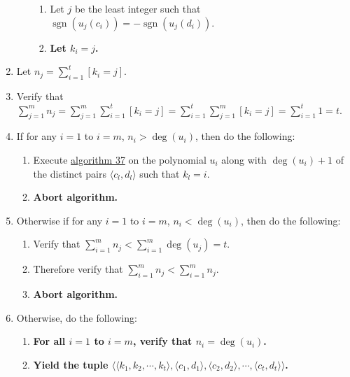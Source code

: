 \documentclass[twocolumn]{article}
\DeclareMathOperator{\sgn}{sgn}
\begin{document}
\begin{enumerate}
\begin{enumerate}
					\begin{enumerate}
						\item Let $j$ be the least integer such that $\sgn(u_j(c_i))=-\sgn(u_j(d_i))$.
						\item \textbf{Let $k_i=j$.}
					\end{enumerate}
				\end{enumerate}
				\item Let $n_j=\sum_{i=1}^t [k_i=j]$.
				\item Verify that $\sum_{j=1}^m n_j=\sum_{j=1}^m\sum_{i=1}^t [k_i=j]=\sum_{i=1}^t\sum_{j=1}^m [k_i=j]=\sum_{i=1}^t 1=t$.
				\item If for any $i=1$ to $i=m$, $n_i>\deg(u_i)$, then do the following:
				\begin{enumerate}
					\item Execute \hyperref[sec:algorithm 37]{algorithm 37} on the polynomial $u_i$ along with $\deg(u_i)+1$ of the distinct pairs $\langle c_l,d_l\rangle$ such that $k_l=i$.
					\item \textbf{Abort algorithm.}
				\end{enumerate}
				\item Otherwise if for any $i=1$ to $i=m$, $n_i<\deg(u_i)$, then do the following:
				\begin{enumerate}
					\item Verify that $\sum_{i=1}^m n_j<\sum_{i=1}^m \deg(u_j)=t$.
					\item Therefore verify that $\sum_{i=1}^m n_j<\sum_{i=1}^m n_j$.
					\item \textbf{Abort algorithm.}
				\end{enumerate}
				\item Otherwise, do the following:
				\begin{enumerate}
					\item \textbf{For all $i=1$ to $i=m$, verify that $n_i=\deg(u_i)$.}
					\item \textbf{Yield the tuple $\langle\langle k_1,k_2,\cdots,k_t\rangle,\langle c_1,d_1\rangle,\langle c_2,d_2\rangle,\cdots,\langle c_t,d_t\rangle\rangle$.}
				\end{enumerate}
			\end{enumerate}
\end{document}
